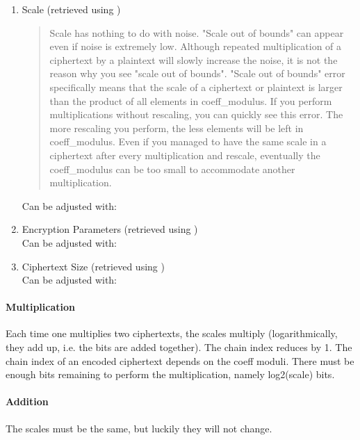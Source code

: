 \begin{enumerate}
  \item Scale (retrieved using )
        \begin{quote}
          Scale has nothing to do with noise. "Scale out of bounds" can appear even if noise is extremely low. Although repeated multiplication of a ciphertext by a plaintext will slowly increase the noise, it is not the reason why you see "scale out of bounds".
          "Scale out of bounds" error specifically means that the scale of a ciphertext or plaintext is larger than the product of all elements in coeff\_modulus. If you perform multiplications without rescaling, you can quickly see this error. The more rescaling you perform, the less elements will be left in coeff\_modulus. Even if you managed to have the same scale in a ciphertext after every multiplication and rescale, eventually the coeff\_modulus can be too small to accommodate another multiplication.
        \end{quote}

        Can be adjusted with: 
  \item Encryption Parameters (retrieved using ) \\
        Can be adjusted with: 
  \item Ciphertext Size (retrieved using ) \\
        Can be adjusted with: 
\end{enumerate}

\paragraph{Multiplication}
Each time one multiplies two ciphertexts, the scales multiply (logarithmically, they add up, i.e. the bits are added together).
The chain index reduces by 1. The chain index of an encoded ciphertext depends on the coeff moduli.
There must be enough bits remaining to perform the multiplication, namely log2(scale) bits.

\paragraph{Addition}
The scales must be the same, but luckily they will not change.

